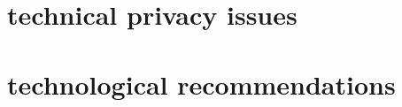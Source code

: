 \documentclass[10pt,onecolcolumn,letterpaper]{article}
\begin{document}
\section{technical privacy issues}

\section{technological recommendations}










\end{document}
